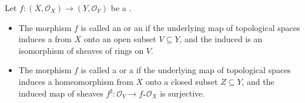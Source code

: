 \begin{definition} \label{definition:open_and_closed_immersions_of_schemes}
Let $f: (X, \mathcal{O}_X) \to (Y, \mathcal{O}_Y)$ be a .
\begin{itemize}
    \item The morphism $f$ is called an  or an  if the underlying map of topological spaces induces a  from $X$ onto an open subset $V \subseteq Y$, and the induced   is an isomorphism of sheaves of rings on $V$.

    \item The morphism $f$ is called a  or a  if the underlying map of topological spaces induces a homeomorphism from $X$ onto a closed subset $Z \subseteq Y$, and the induced map of sheaves $f^\sharp: \mathcal{O}_Y \to f_* \mathcal{O}_X$ is surjective.
\end{itemize}
\end{definition}